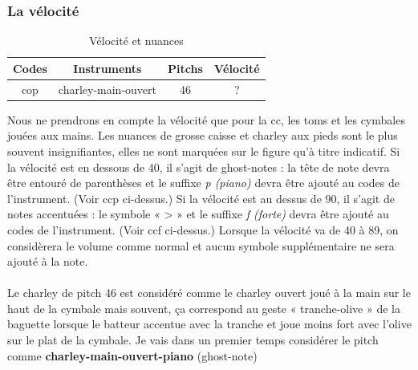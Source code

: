 \subsubsection{La vélocité}
\begin{table}[h]
	\centering
	\begin{tabular}{|c|c|c|c|} \hline
		Codes & Instruments & Pitchs & Vélocité \\ \hline
		cop & charley-main-ouvert & 46 & ? \\ \hline
	\end{tabular}
	\caption{Vélocité et nuances}
\end{table}
Nous ne prendrons en compte la vélocité que pour la cc, les toms et les cymbales jouées aux mains. Les nuances de grosse caisse et charley aux pieds sont le plus souvent insignifiantes, elles ne sont marquées sur le figure qu’à titre indicatif.
Si la vélocité est en dessous de 40, il s’agit de ghost-notes : la tête de note devra être entouré de parenthèses et le suffixe \textit{p (piano)} devra être ajouté au codes de l’instrument. (Voir ccp ci-dessus.)
Si la vélocité est au dessus de 90, il s’agit de notes accentuées : le symbole « > » et le suffixe \textit{f (forte)} devra être ajouté au codes de l’instrument. (Voir ccf ci-dessus.)
Lorsque la vélocité va de 40 à 89, on considèrera le volume comme normal et aucun symbole supplémentaire ne sera ajouté à la note.\\\\

Le charley de pitch 46 est considéré comme le charley ouvert joué à la main sur le haut de la cymbale mais souvent, ça correspond au geste « tranche-olive » de la baguette lorsque le batteur accentue avec la tranche et joue moins fort avec l’olive sur le plat de la cymbale. Je vais dans un premier temps considérer le pitch comme \textbf{charley-main-ouvert-piano} (ghost-note)
